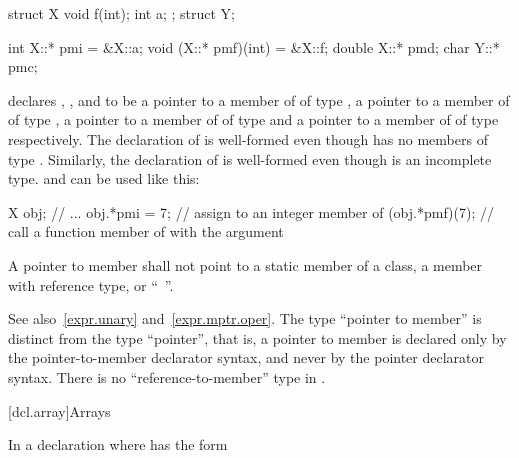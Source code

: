 \pnum
\begin{example}
\begin{codeblock}
struct X {
  void f(int);
  int a;
};
struct Y;

int X::* pmi = &X::a;
void (X::* pmf)(int) = &X::f;
double X::* pmd;
char Y::* pmc;
\end{codeblock}

declares
,
,
and
to be a pointer to a member of
of type
,
a pointer to a member of
of type
,
a pointer to a member of
of type
and a pointer to a member of
of type
respectively.
The declaration of
is well-formed even though
has no members of type
.
Similarly, the declaration of
is well-formed even though
is an incomplete type.
and
can be used like this:
\begin{codeblock}
X obj;
// ...
obj.*pmi = 7;       // assign  to an integer member of 
(obj.*pmf)(7);      // call a function member of  with the argument 
\end{codeblock}
\end{example}

\pnum
A pointer to member shall not point to a static member
of a class,
a member with reference type,
or
``\cv{}~''.

\begin{note}
See also~\ref{expr.unary} and~\ref{expr.mptr.oper}.
The type ``pointer to member'' is distinct from the type ``pointer'',
that is, a pointer to member is declared only by the pointer-to-member
declarator syntax, and never by the pointer declarator syntax.
There is no ``reference-to-member'' type in \Cpp{}.
\end{note}

[dcl.array]{Arrays}%

\pnum
In a declaration
where
has the form

\begin{ncsimplebnf}
\terminal{D1 [}  \terminal{]} 
\end{ncsimplebnf}

